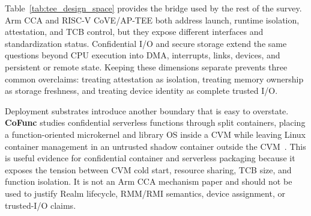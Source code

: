 Table~\ref{tab:tee_design_space} provides the bridge used by the rest of the
survey. Arm CCA and RISC-V CoVE/AP-TEE both address launch, runtime isolation,
attestation, and TCB control, but they expose different interfaces and
standardization status. Confidential I/O and secure storage extend the same
questions beyond CPU execution into DMA, interrupts, links, devices, and
persistent or remote state. Keeping these dimensions separate prevents three
common overclaims: treating attestation as isolation, treating memory ownership
as storage freshness, and treating device identity as complete trusted I/O.

Deployment substrates introduce another boundary that is easy to overstate.
\textbf{CoFunc} studies confidential serverless functions through split
containers, placing a function-oriented microkernel and library OS inside a CVM
while leaving Linux container management in an untrusted shadow container
outside the CVM~\cite{shi2025cofunc}. This is useful evidence for confidential
container and serverless packaging because it exposes the tension between CVM
cold start, resource sharing, TCB size, and function isolation. It is not an
Arm CCA mechanism paper and should not be used to justify Realm lifecycle,
RMM/RMI semantics, device assignment, or trusted-I/O claims.
